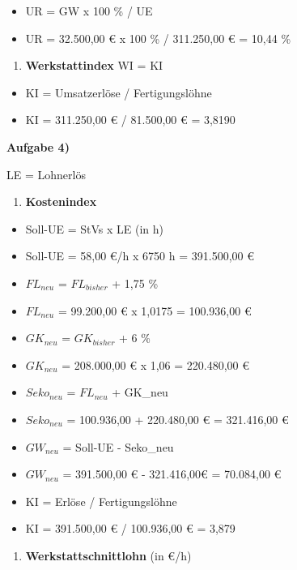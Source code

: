\begin{itemize}
\item
  UR = GW x 100 \% / UE
\item
  UR = 32.500,00 € x 100 \% / 311.250,00 € = 10,44 \%
\end{itemize}

\begin{enumerate}
\def\labelenumi{\alph{enumi})}
\setcounter{enumi}{3}
\item
  \textbf{Werkstattindex} WI = KI
\end{enumerate}

\begin{itemize}
\item
  KI = Umsatzerlöse / Fertigungslöhne
\item
  KI = 311.250,00 € / 81.500,00 € = 3,8190
\end{itemize}

\textbf{Aufgabe 4)}

LE = Lohnerlös

\begin{enumerate}
\def\labelenumi{\alph{enumi})}
\item
  \textbf{Kostenindex}
\end{enumerate}

\begin{itemize}
\item
  Soll-UE = StVs x LE (in h)
\item
  Soll-UE = 58,00 €/h x 6750 h = 391.500,00 €
\item
  $FL_{neu}$ = $FL_{bisher}$ + 1,75 \%
\item
  $FL_{neu}$ = 99.200,00 € x 1,0175 = 100.936,00 €
\item
  $GK_{neu}$ = $GK_{bisher}$ + 6 \%
\item
  $GK_{neu}$ = 208.000,00 € x 1,06 = 220.480,00 €
\item
  $Seko_{neu}$ = $FL_{neu}$ + GK\_neu
\item
  $Seko_{neu}$ = 100.936,00 + 220.480,00 € = 321.416,00 €
\item
  $GW_{neu}$ = Soll-UE - Seko\_neu
\item
  $GW_{neu}$ = 391.500,00 € - 321.416,00€ = 70.084,00 €
\item
  KI = Erlöse / Fertigungslöhne
\item
  KI = 391.500,00 € / 100.936,00 € = 3,879
\end{itemize}

\begin{enumerate}
\def\labelenumi{\alph{enumi})}
\setcounter{enumi}{1}
\item
  \textbf{Werkstattschnittlohn} (in €/h)
\end{enumerate}

